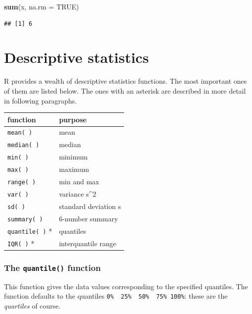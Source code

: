 \documentclass[]{book}
\newenvironment{Shaded}{\begin{snugshade}}{\end{snugshade}}
\newcommand{\DataTypeTok}[1]{\textcolor[rgb]{0.13,0.29,0.53}{#1}}
\newcommand{\KeywordTok}[1]{\textcolor[rgb]{0.13,0.29,0.53}{\textbf{#1}}}
\newcommand{\NormalTok}[1]{#1}
\newcommand{\OperatorTok}[1]{\textcolor[rgb]{0.81,0.36,0.00}{\textbf{#1}}}
\newcommand{\OtherTok}[1]{\textcolor[rgb]{0.56,0.35,0.01}{#1}}
\begin{document}
\begin{Shaded}
\begin{Highlighting}[]
\KeywordTok{sum}\NormalTok{(x, }\DataTypeTok{na.rm =} \OtherTok{TRUE}\NormalTok{)}
\end{Highlighting}
\end{Shaded}

\begin{verbatim}
## [1] 6
\end{verbatim}

\hypertarget{descriptive-statistics}{%
\section{Descriptive statistics}\label{descriptive-statistics}}

R provides a wealth of descriptive statistics functions. The most important ones of them are listed below. The ones with an asterisk are described in more detail in following paragraphs.

\begin{longtable}[]{@{}ll@{}}
\toprule
function & purpose\tabularnewline
\midrule
\endhead
\texttt{mean(\ )} & mean\tabularnewline
\texttt{median(\ )} & median\tabularnewline
\texttt{min(\ )} & minimum\tabularnewline
\texttt{max(\ )} & maximum\tabularnewline
\texttt{range(\ )} & min and max\tabularnewline
\texttt{var(\ )} & variance s\^{}2\tabularnewline
\texttt{sd(\ )} & standard deviation s\tabularnewline
\texttt{summary(\ )} & 6-number summary\tabularnewline
\texttt{quantile(\ )} * & quantiles\tabularnewline
\texttt{IQR(\ )} * & interquantile range\tabularnewline
\bottomrule
\end{longtable}

\hypertarget{the-quantile-function}{%
\subsubsection*{\texorpdfstring{The \texttt{quantile()} function}{The quantile() function}}\label{the-quantile-function}}

This function gives the data values corresponding to the specified quantiles. The function defaults to the quantiles \texttt{0\%\ \ 25\%\ \ 50\%\ \ 75\%\ 100\%}: these are the \emph{quartiles} of course.

\begin{Shaded}
\end{Shaded}
\end{document}
